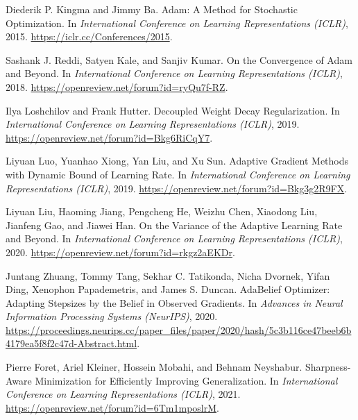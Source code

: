\begin{thebibliography}{99}

Diederik P. Kingma and Jimmy Ba.
\newblock Adam: A Method for Stochastic Optimization.
\newblock In \emph{International Conference on Learning Representations (ICLR)}, 2015.
\newblock \url{https://iclr.cc/Conferences/2015}.

Sashank J. Reddi, Satyen Kale, and Sanjiv Kumar.
\newblock On the Convergence of Adam and Beyond.
\newblock In \emph{International Conference on Learning Representations (ICLR)}, 2018.
\newblock \url{https://openreview.net/forum?id=ryQu7f-RZ}.

Ilya Loshchilov and Frank Hutter.
\newblock Decoupled Weight Decay Regularization.
\newblock In \emph{International Conference on Learning Representations (ICLR)}, 2019.
\newblock \url{https://openreview.net/forum?id=Bkg6RiCqY7}.

Liyuan Luo, Yuanhao Xiong, Yan Liu, and Xu Sun.
\newblock Adaptive Gradient Methods with Dynamic Bound of Learning Rate.
\newblock In \emph{International Conference on Learning Representations (ICLR)}, 2019.
\newblock \url{https://openreview.net/forum?id=Bkg3g2R9FX}.

Liyuan Liu, Haoming Jiang, Pengcheng He, Weizhu Chen, Xiaodong Liu, Jianfeng Gao, and Jiawei Han.
\newblock On the Variance of the Adaptive Learning Rate and Beyond.
\newblock In \emph{International Conference on Learning Representations (ICLR)}, 2020.
\newblock \url{https://openreview.net/forum?id=rkgz2aEKDr}.

Juntang Zhuang, Tommy Tang, Sekhar C. Tatikonda, Nicha Dvornek, Yifan Ding, Xenophon Papademetris, and James S. Duncan.
\newblock AdaBelief Optimizer: Adapting Stepsizes by the Belief in Observed Gradients.
\newblock In \emph{Advances in Neural Information Processing Systems (NeurIPS)}, 2020.
\newblock \url{https://proceedings.neurips.cc/paper_files/paper/2020/hash/5c3b116ce47beeb6b4179ea5f8f2c47d-Abstract.html}.

Pierre Foret, Ariel Kleiner, Hossein Mobahi, and Behnam Neyshabur.
\newblock Sharpness-Aware Minimization for Efficiently Improving Generalization.
\newblock In \emph{International Conference on Learning Representations (ICLR)}, 2021.
\newblock \url{https://openreview.net/forum?id=6Tm1mposlrM}.


\end{thebibliography}
